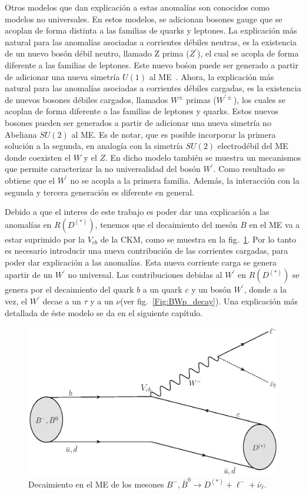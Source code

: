 Otros modelos que dan explicación a estas anomalías son conocidos como modelos no universales. En estos modelos, se adicionan bosones gauge que se acoplan de forma distinta a las familias de quarks y leptones. La explicación más natural para las anomalías asociadas a corrientes débiles neutras, es la existencia de un nuevo bosón débil neutro, llamado Z prima ($Z^{\prime}$), el cual se acopla de forma diferente a las familias de leptones. Este nuevo bośon puede ser generado a partir de adicionar una  nueva simetría $U(1)$ al ME~\cite{Dalchenko:2017shg}. Ahora, la explicación más natural para las anomalías asociadas a corrientes débiles cargadas, es la existencia de nuevos bosones débiles cargados, llamados $W^{\pm}$ primas ($W^{\prime \pm}$), los cuales se acoplan de forma diferente a las familias de leptones y quarks. Estos nuevos bosones pueden ser generados a partir de adicionar una nueva simetría no Abeliana $SU(2)$ al ME. Es de notar, que es posible incorporar la primera solución a la segunda, en analogía con la simetría $SU(2)$ electrodébil del ME~\cite{Boucenna:2016wpr} donde coexisten el $W$ y el $Z$. 
En dicho modelo también se muestra un mecanismos que permite caracterizar la no universalidad del bosón $W^{\prime}$. Como resultado se obtiene que el $W^{\prime}$ no se acopla a la primera familia. Además, la interacción con la segunda y tercera generación es diferente en general.

Debido a que el interes de este trabajo es poder dar una explicación a las anomalías en $R(D^{(*)})$, tenemos que el decaimiento del mesón $B$ en el ME va a estar suprimido por la $V_{cb}$ de la CKM, como se muestra en la fig.~\ref{Fig:BW_decay}. Por lo tanto es necesario introducir una nueva contribución de las corrientes cargadas, para poder dar explicación a las anomalías. Esta nueva corriente carga se genera apartir de un $W^{\prime}$ no universal.  Las contribuciones debidas al $W^{\prime}$ en $R(D^{(*)})$ se genera por el decaimiento del quark $b$ a un quark $c$ y un bosón $W^{\prime}$, donde a la vez, el $W^{\prime}$ decae a un $\tau$ y a un $\nu$(ver fig.~\ref{Fig:BWp_decay}). Una explicación más detallada de éste modelo se da en el siguiente capítulo.

%
\begin{figure}
\centering
\includegraphics[scale=0.6]{figures/BW_decay}
\caption{Decaimiento en el ME de los mesones $B^{-}, \bar{B}^{0} \to D^{(*)} + \ell^{-} + \bar{\nu}_{\ell}$.}
\label{Fig:BW_decay}
\end{figure}
%

